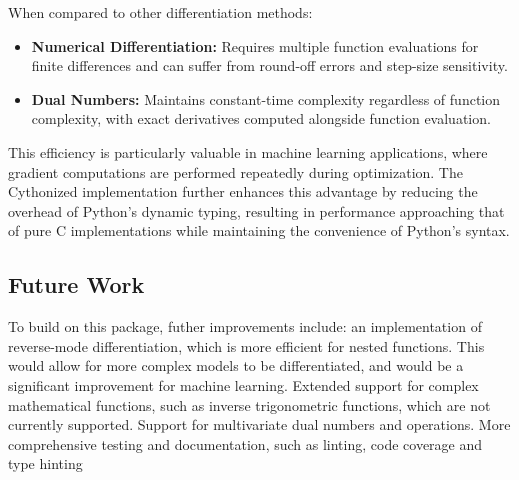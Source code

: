 When compared to other differentiation methods:
\begin{itemize}
    \item \textbf{Numerical Differentiation:} Requires multiple function evaluations for finite differences and can suffer from round-off errors and step-size sensitivity.
    \item \textbf{Dual Numbers:} Maintains constant-time complexity regardless of function complexity, with exact derivatives computed alongside function evaluation.
\end{itemize}

This efficiency is particularly valuable in machine learning applications, where gradient computations are 
performed repeatedly during optimization. 
The Cythonized implementation further enhances this advantage by reducing the overhead of Python's dynamic typing, 
resulting in performance approaching that of pure C implementations while maintaining the convenience of Python's syntax.

\subsection{Future Work}
To build on this package, futher improvements include: 
an implementation of reverse-mode differentiation, which is more efficient for nested functions. 
This would allow for more complex models to be differentiated, and would be a significant improvement for machine learning.
Extended support for complex mathematical functions, such as inverse trigonometric functions, 
which are not currently supported. Support for multivariate dual numbers and operations.
More comprehensive testing and documentation, such as linting, code coverage and type hinting